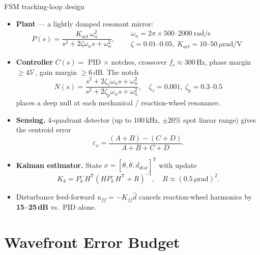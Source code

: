 \documentclass{KAIST-slide}
\newcommand{\ai}{\item[\textcolor{islcteal}{\ding{228}}]}      %
\newcommand{\si}{\item[\textcolor{islcorange}{\ding{167}}]}    %
\newcommand{\hi}[1]{\textcolor{islcorange}{\textbf{#1}}}       %
\newcommand{\key}[1]{\textcolor{islcblue}{\textbf{#1}}}        %
\begin{document}
\begin{frame}[allowframebreaks=1.2]{FSM tracking-loop design}
    \begin{itemize}
        \ai \hi{Plant} --- a lightly damped resonant mirror:
        \begin{equation*}
            P(s)=\frac{K_{act}\,\omega_n^{2}}{s^{2}+2\zeta\omega_n s+\omega_n^{2}},\quad
            \begin{aligned}
            &\omega_n = 2\pi\!\times\!500\text{--}2000\ \text{rad/s}\\
            &\zeta = 0.01\text{--}0.05,\ K_{act}=10\text{--}50\,\mu\text{rad/V}
            \end{aligned}
        \end{equation*}
        \ai \hi{Controller} $C(s)=$ PID $\times$ notches, crossover $f_c\approx300$\,Hz, phase margin $\ge45^\circ$, gain margin $\ge6$\,dB. The notch
        \begin{equation*}
            N(s)=\frac{s^{2}+2\zeta_z\omega_n s+\omega_n^{2}}{s^{2}+2\zeta_p\omega_n s+\omega_n^{2}},\quad \zeta_z\!=\!0.001,\ \zeta_p\!=\!0.3\text{--}0.5
        \end{equation*}
        places a deep null at each mechanical / reaction-wheel resonance.
    \end{itemize}
    \framebreak
    \begin{itemize}
        \ai \hi{Sensing.} 4-quadrant detector (up to 100\,kHz, $\pm$20\% spot linear range) gives the centroid error
        \begin{equation*}
            \varepsilon_x=\frac{(A+B)-(C+D)}{A+B+C+D}.
        \end{equation*}
        \ai \hi{Kalman estimator.} State $x=[\theta,\dot\theta,d_{dist}]^\mathsf{T}$ with update
        \begin{equation*}
            K_k = P_k^{-}H^\mathsf{T}\!\left(HP_k^{-}H^\mathsf{T}+R\right)^{-1},\quad R\approx(0.5\,\mu\text{rad})^2 .
        \end{equation*}
        \si Disturbance feed-forward $u_{ff}=-K_{ff}\hat d$ cancels reaction-wheel harmonics by \key{15--25\,dB} vs.\ PID alone.
    \end{itemize}
\end{frame}

\section{Wavefront Error Budget}
\end{document}
